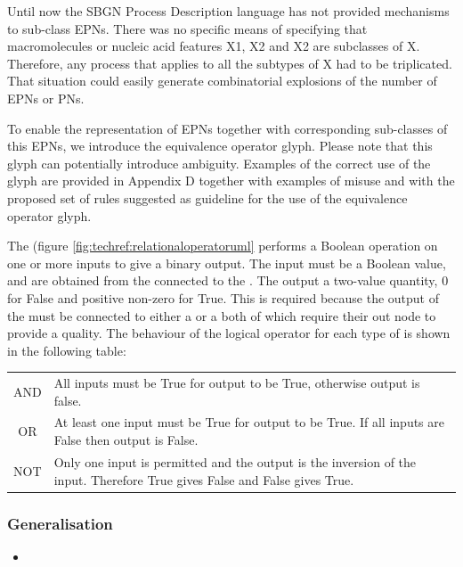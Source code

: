 Until now the SBGN Process Description language has not provided mechanisms to sub-class EPNs. There was no specific means of specifying that macromolecules or nucleic acid features X1, X2 and X2 are subclasses of X. Therefore, any process that applies to all the subtypes of X had to be triplicated. That situation could easily generate combinatorial explosions of the number of EPNs or PNs. 

To enable the representation of EPNs together with corresponding sub-classes of this EPNs, we introduce the equivalence operator glyph. Please note that this glyph can potentially introduce ambiguity. Examples of the correct use of the glyph are provided in Appendix D together with examples of misuse and with the proposed set of rules suggested as guideline for the use of the equivalence operator glyph.




 The  (figure \ref{fig:techref:relationaloperatoruml} performs a Boolean operation on one or
more inputs to give a binary output. The input must be a Boolean
value, and are obtained from the  connected to the
. The output a two-value quantity,  0 for False and positive
non-zero for True. This is required because the output of the
 must be connected to either a
 or a  both of which
require their out node to provide a quality. The behaviour of the
logical operator for each type of  is shown in
the following table:

\begin{tabular}[t]{c p{12cm}}
\toprule
AND & All inputs must be True for output to be True, otherwise output
is false.\\
OR & At least one input must be True for output to be True. If all
inputs are False then output is False.\\
NOT & Only one input is permitted and the output is the inversion of
the input. Therefore True gives False and False gives True.\\
\bottomrule
\end{tabular}

\subsubsection{Generalisation}

\begin{itemize}
\item {}
\end{itemize}

